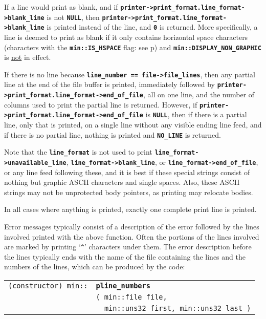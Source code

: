 \documentclass[12pt]{article}
\makeatletter
\newcommand{\TT}[1]{{\tt \bfseries #1}}
\newcommand{\ttindex}[1]{\index{#1@{\tt #1}}}
\newcommand{\pagref}[1]{p\pageref{#1}}
\newcommand{\EOL}{\penalty \exhyphenpenalty}
\newenvironment{indpar}[1][0.3in]%
	{\begin{list}{}%
		     {\setlength{\itemsep}{0in}%
		      \setlength{\topsep}{0in}%
		      \setlength{\parsep}{1ex}%
		      \setlength{\labelwidth}{#1}%
		      \setlength{\leftmargin}{#1}%
		      \addtolength{\leftmargin}{\labelsep}}%
	 \item}%
	{\end{list}}
\newcommand{\LABEL}[1]{\label{#1}}
\newlength{\ARGBREAKLENGTH}
\newcommand{\ARGBREAK}[1][\ARGBREAKLENGTH]{\\&\hspace*{#1}}
\newcommand{\MINKEY}[1]%
	   {\TT{#1}\ttindex{min::#1}\ttindex{#1}}
\makeatother
\begin{document}
If a line would print as blank, and if
\TT{printer->\EOL print\_\EOL format\EOL .line\_\EOL format->\EOL blank\_\EOL line} is not \TT{NULL}, then
\TT{printer->\EOL print\_\EOL format\EOL .line\_\EOL format->\EOL blank\_\EOL line} is printed instead of
the line, and \TT{0} is returned.
More specifically, a line is deemed to print as blank if it only contains
horizontal space characters
(characters with the \TT{min::\EOL IS\_\EOL HSPACE} flag:
see \pagref{IS-HSPACE}) and \TT{min::DISPLAY\_\EOL NON\_\EOL GRAPHIC}
is \underline{not} in effect.

If there is no line
because \TT{line\_\EOL number == file->\EOL file\_\EOL lines},
then any partial line at the end of the file buffer is printed,
immediately followed by
\TT{printer->\EOL print\_\EOL format\EOL .line\_\EOL format->\EOL end\_\EOL of\_\EOL file}, all on one line,
and the number of columns used to print the partial line is returned.
However, if \TT{printer->\EOL print\_\EOL format\EOL .line\_\EOL format->\EOL end\_\EOL of\_\EOL file}
is \TT{NULL}, then
if there is a partial line, only that is printed, on a single line
without any visible ending line feed, and if there is no partial line,
nothing is printed and \TT{NO\_\EOL LINE} is returned.

Note that the \TT{line\_\EOL format} is not used to print
\TT{line\_\EOL for\-mat->\EOL unavailable\_\EOL line},
\TT{line\_\EOL for\-mat->\EOL blank\_\EOL line}, or
\TT{line\_\EOL for\-mat->\EOL end\_\EOL of\_\EOL file},
or any line feed following these,
and it is best if these special strings consist of nothing but
graphic ASCII characters and single spaces.
Also, these ASCII strings may not be unprotected body pointers,
as printing may relocate bodies.

In all cases where anything is printed, exactly one complete print line is
printed.

Error messages typically consist of a description of the error
followed by the lines involved printed with the above function.
Often the portions of the lines involved are marked by printing
`\TT{\^{ }}' characters under them.  The error description before
the lines typically ends with the name of the file containing
the lines and the numbers of the lines, which can be produced
by the code:

\begin{indpar}[1em]\begin{tabular}{r@{}l}
\verb|(constructor) min::| & \MINKEY{pline\_numbers}\ARGBREAK
    \verb|( min::file file,|\ARGBREAK
    \verb|  min::uns32 first, min::uns32 last )|
\LABEL{MIN::PLINE_NUMBERS} \\
\end{tabular}\end{indpar}
\end{document}
